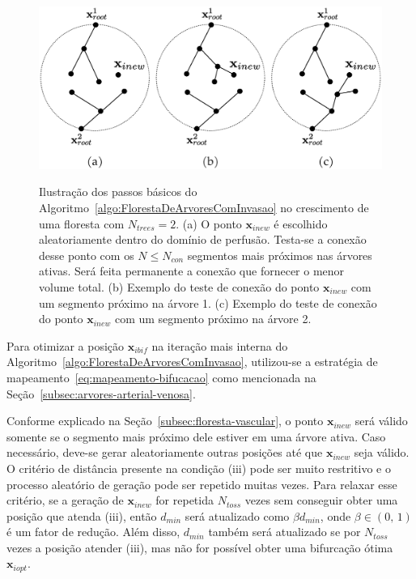 \begin{figure}[!htb]
  \centering
  \captiondelim{: }
  \caption{Ilustração dos passos básicos do Algoritmo~\ref{algo:FlorestaDeArvoresComInvasao} no crescimento 
    de uma floresta com $N_{trees} = 2$. 
    (a) O ponto $\mathbf{x}_{inew}$ é escolhido aleatoriamente dentro do domínio de perfusão. 
    Testa-se a conexão desse ponto com os $N \leq N_{con}$ segmentos mais próximos 
    nas árvores ativas. Será feita permanente a conexão que fornecer o menor volume total. 
    (b) Exemplo do teste de conexão do ponto $\mathbf{x}_{inew}$ com
    um segmento próximo na árvore 1.
    (c) Exemplo do teste de conexão do ponto $\mathbf{x}_{inew}$ com
    um segmento próximo na árvore 2.
  }
  \includegraphics[scale=0.4]{figuras/modelos-computacionais-de-arvores-circulatorias/passos-algoritmo-cco-narvores.eps}
  \label{fig:passos-metodo-proposto}
\end{figure}

Para otimizar a posição $\mathbf{x}_{ibif}$ na iteração mais
interna do Algoritmo~\ref{algo:FlorestaDeArvoresComInvasao}, utilizou-se a 
estratégia de mapeamento~\eqref{eq:mapeamento-bifucacao} como mencionada na 
Seção~\ref{subsec:arvores-arterial-venosa}.

Conforme explicado na Seção~\ref{subsec:floresta-vascular}, o ponto $\mathbf{x}_{inew}$ será 
válido somente se o segmento mais próximo dele estiver em uma 
árvore ativa. Caso necessário, deve-se gerar aleatoriamente outras posições 
até que $\mathbf{x}_{inew}$ seja válido. O critério de distância presente na 
condição (iii) pode ser muito restritivo e o processo aleatório de geração pode 
ser repetido muitas vezes. Para relaxar esse critério, 
se a geração de $\mathbf{x}_{inew}$ for repetida $N_{toss}$ vezes sem conseguir 
obter uma posição que atenda (iii), então $d_{min}$ será atualizado como 
$\beta d_{min}$, onde $\beta\in (0,\,1)$ é um fator de redução. Além disso, 
$d_{min}$ também será atualizado se por $N_{toss}$ vezes a posição atender 
(iii), mas não for possível obter uma bifurcação ótima $\mathbf{x}_{iopt}$.

